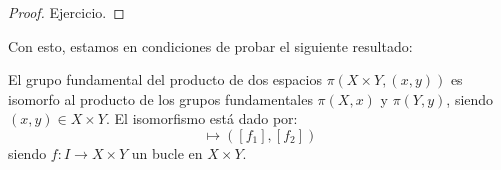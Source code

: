 \documentclass{article}
\theoremstyle{largebreak}
\newcommand\cf[3]{\ensuremath{#1:#2\rightarrow#3}}
\begin{document}
    \begin{proof}
        Ejercicio.
    \end{proof}

    Con esto, estamos en condiciones de probar el siguiente resultado:

    \begin{theor}
        El grupo fundamental del producto de dos espacios $\pi(X\times Y, (x,y))$ es isomorfo al producto de los grupos fundamentales $\pi(X,x)$ y $\pi(Y,y)$, siendo $(x,y)\in X\times Y$. El isomorfismo está dado por:
        \begin{equation*}
            [f]\mapsto ([f_1],[f_2])
        \end{equation*}
        siendo $\cf{f}{I}{X\times Y}$ un bucle en $X\times Y$.
    \end{theor}
\end{document}
